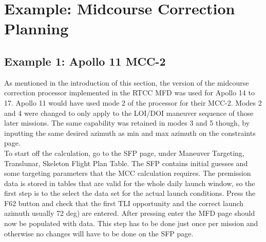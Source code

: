 \documentclass[11pt]{article} %
\begin{document}
\newpage
\section{Example: Midcourse Correction Planning}
\subsection{Example 1: Apollo 11 MCC-2}

As mentioned in the introduction of this section, the version of the midcourse correction processor implemented in the RTCC MFD was used for Apollo 14 to 17. Apollo 11 would have used mode 2 of the processor for their MCC-2. Modes 2 and 4 were changed to only apply to the LOI/DOI maneuver sequence of those later missions. The same capability was retained in modes 3 and 5 though, by inputting the same desired azimuth as min and max azimuth on the constraints page.\\

To start off the calculation, go to the SFP page, under Maneuver Targeting, Translunar, Skeleton Flight Plan Table. The SFP contains initial guesses and some targeting parameters that the MCC calculation requires. The premission data is stored in tables that are valid for the whole daily launch window, so the first step is to the select the data set for the actual launch conditions. Press the F62 button and check that the first TLI opportunity and the correct launch azimuth usually 72 deg) are entered. After pressing enter the MFD page should now be populated with data. This step has to be done just once per mission and otherwise no changes will have to be done on the SFP page.\\
\end{document}
